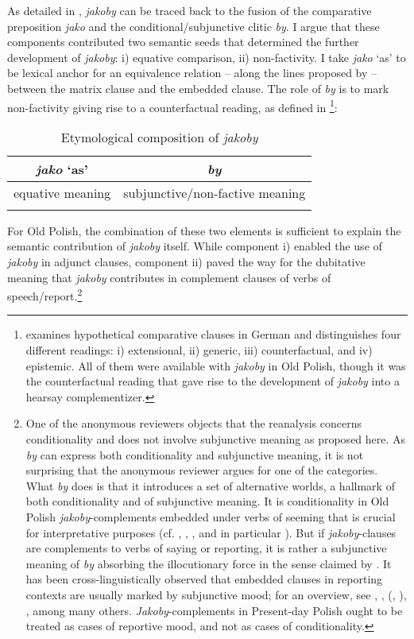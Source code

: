\documentclass[output=paper
,modfonts
,nonflat]{langsci/langscibook}
\begin{document}
As detailed in , \emph{jakoby} can be traced back to the fusion of the comparative preposition \emph{jako} and the conditional\slash subjunctive clitic \emph{by}. I argue that these components contributed two semantic seeds that determined the further development of \emph{jakoby}: i) equative comparison, ii) non-factivity. I take \emph{jako} `as' to be lexical anchor for an equivalence relation – along the lines proposed by \textcite{Umbach-Gust2014} – between the matrix clause and the embedded clause. The role of \emph{by} is to mark non-factivity giving rise to a counterfactual reading, as defined in \textcite[988]{Bucking2017}\footnote{\textcite{Bucking2017} examines hypothetical comparative clauses in German and distinguishes four different readings: i) extensional, ii) generic, iii) counterfactual, and iv) epistemic. All of them were available with \emph{jakoby} in Old Polish, though it was the counterfactual reading that gave rise to the development of \emph{jakoby} into a hearsay complementizer. 
}:  

\begin{table}[h] 
\begin{tabular}{cc} 
 \lsptoprule
 \emph{jako} `as' & \emph{by} \\
\midrule
equative meaning & subjunctive\slash non-factive meaning \\
 \lspbottomrule
\end{tabular}
\caption{Etymological composition of \emph{jakoby}}
\end{table}
  
\noindent For Old Polish, the combination of these two elements is sufficient to explain the semantic contribution of \emph{jakoby} itself. While component i) enabled the use of \emph{jakoby} in adjunct clauses, component ii) paved the way for the dubitative meaning that \emph{jakoby} contributes in complement clauses of verbs of speech\slash report.\footnote{One of the anonymous reviewers objects that the reanalysis concerns conditionality and does not involve subjunctive meaning as proposed here.  As \emph{by} can express both conditionality and subjunctive meaning, it is not surprising that the anonymous reviewer argues for one of the categories. What \emph{by} does is that it introduces a set of alternative worlds, a hallmark of both conditionality and of subjunctive meaning. It is conditionality in Old Polish \emph{jakoby}-complements embedded under verbs of seeming that is crucial for interpretative purposes (cf. \textcite{Stalnaker1968}, \textcite{Lewis1973}, \textcite{Fintel2011}, and in particular \textcite{Bucking2017}). But if \emph{jakoby}-clauses are complements to verbs of saying or reporting, it is rather a subjunctive meaning of \emph{by} absorbing the illocutionary force in the sense claimed by \textcite{Truckenbrodt2006}. It has been cross-linguistically observed that embedded clauses in reporting contexts are usually marked by subjunctive mood; for an overview, see \textcite{Becker-Remberger2010}, \textcite{Fabricius-Hansen-Saebo2004}, \citeauthor{Portner1997} (\citeyear{Portner1997}, \citeyear{Portner2018}), \textcite{Sode2014}, among many others. \emph{Jakoby}-complements in Present-day Polish ought to be treated as cases of reportive mood, and not as cases of conditionality. 
} 
\end{document}
